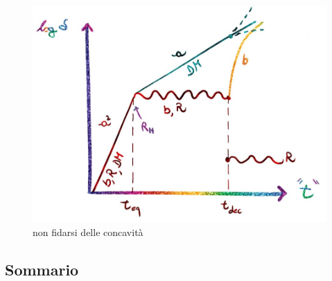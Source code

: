 \begin{figure}[H]
    \centering
    \includegraphics[width=.8 \textwidth]{Pictures/6/dmgrowingfactor.jpg}
    \caption{non fidarsi delle concavità}
\end{figure}


\subsection{Sommario}
